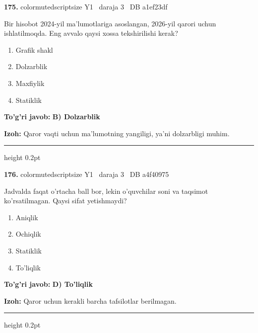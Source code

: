 \documentclass[10pt,a4paper,oneside]{article}
\begin{document}
\noindent\textbf{\color{ink}175.}  {color{muted}scriptsize Y1 \textbullet\ daraja 3 \textbullet\ DB a1ef23df}
\par
Bir hisobot 2024-yil ma'lumotlariga asoslangan, 2026-yil qarori uchun ishlatilmoqda. Eng avvalo qaysi xossa tekshirilishi kerak?
\begin{enumerate}[label=\Alph*),leftmargin=9mm]
\item Grafik shakl
\item Dolzarblik
\item Maxfiylik
\item Statiklik
\end{enumerate}
\begin{tcolorbox}[enhanced,breakable,colback=teal!4,colframe=teal!50!black,boxrule=0.5pt,arc=1.1mm,left=3mm,right=3mm,top=1.7mm,bottom=1.7mm,before skip=2mm,after skip=2mm]
\textbf{\color{teal}To'g'ri javob:} \textbf{B) Dolzarblik}
\par\smallskip
\textbf{Izoh:} Qaror vaqti uchun ma'lumotning yangiligi, ya'ni dolzarbligi muhim.
\end{tcolorbox}
\vspace{2mm}\hrule height 0.2pt \vspace{3mm}

\noindent\textbf{\color{ink}176.}  {color{muted}scriptsize Y1 \textbullet\ daraja 3 \textbullet\ DB a4f40975}
\par
Jadvalda faqat o'rtacha ball bor, lekin o'quvchilar soni va taqsimot ko'rsatilmagan. Qaysi sifat yetishmaydi?
\begin{enumerate}[label=\Alph*),leftmargin=9mm]
\item Aniqlik
\item Ochiqlik
\item Statiklik
\item To'liqlik
\end{enumerate}
\begin{tcolorbox}[enhanced,breakable,colback=teal!4,colframe=teal!50!black,boxrule=0.5pt,arc=1.1mm,left=3mm,right=3mm,top=1.7mm,bottom=1.7mm,before skip=2mm,after skip=2mm]
\textbf{\color{teal}To'g'ri javob:} \textbf{D) To'liqlik}
\par\smallskip
\textbf{Izoh:} Qaror uchun kerakli barcha tafsilotlar berilmagan.
\end{tcolorbox}
\vspace{2mm}\hrule height 0.2pt \vspace{3mm}
\end{document}
